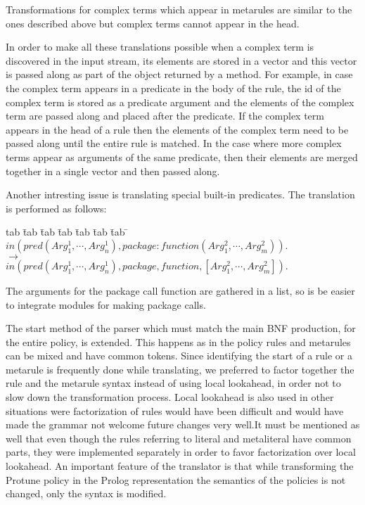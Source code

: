 \documentclass{article}
\newenvironment{program}{\begin{tabbing}
   tab \= tab \= tab \= tab \= tab \= tab \= tab \= \kill}{\end{tabbing}}
\newcommand{\rewrite}{\longrightarrow}
\begin{document}
Transformations for complex terms which appear in metarules are similar to the ones described above but complex terms cannot appear in the head.

In order to make all these translations possible when a complex term is discovered in the input stream, its elements are stored in a vector and this vector is passed along as part of the object returned by a method. For example, in case the complex term appears in a predicate in the body of the rule, the id of the complex term is stored as a predicate argument and the elements of the complex term are passed along and placed after the predicate. If the complex term appears in the head of a rule then the elements of the complex term need to be passed along until the entire rule is matched. In the case where more complex terms appear as arguments of the same predicate,
then their elements are merged together in a single vector and then passed along.

Another intresting issue is translating special built-in predicates. The translation is performed as follows:

\begin{program}
$in(pred(Arg^1_1, \cdots, Arg^1_n), package:function(Arg^2_1, \cdots, Arg^2_m)).$\\
\> $\rewrite$ \\
\> \> $in(pred(Arg^1_1, \cdots, Arg^1_n ),package, function, [Arg^2_1, \cdots, Arg^2_m]).$
\end{program}

The arguments for the package call function are gathered in a list, so is be easier to integrate modules for making package calls. 

The start method of the parser which must match the main BNF production, for the entire policy, is extended. This happens as in the policy rules and metarules can be mixed and have common tokens. Since identifying the start of a rule or a metarule is frequently done while translating, we preferred to factor together the rule and the metarule syntax instead of using local lookahead, in order not to slow down the transformation process. Local lookahead is also used in other situations were factorization of rules would have been difficult and would have made the grammar not welcome future changes very well.It must be mentioned as well that even though the rules referring to literal and metaliteral have common parts, they were implemented separately in order to favor factorization over local lookahead. An important feature of the translator is that while transforming the Protune policy in the Prolog representation the semantics of the policies is not changed, only the syntax is modified.
\end{document}

